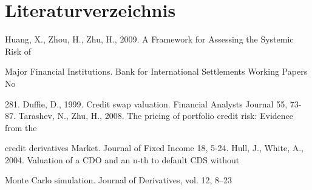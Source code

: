 \documentclass[a4paper,12pt]{scrartcl}
\begin{document}
\section{Literaturverzeichnis}

Huang, X., Zhou, H., Zhu, H., 2009. A Framework for Assessing the Systemic Risk of

Major Financial Institutions. Bank for International Settlements Working Papers  No

281.
\newline
\newline
Duffie, D., 1999. Credit swap valuation. Financial Analysts Journal 55, 73-87.
\newline
\newline
Tarashev, N., Zhu, H., 2008. The pricing of portfolio credit risk: Evidence from the

credit derivatives Market. Journal of Fixed Income 18, 5-24.
\newline
\newline
Hull, J., White, A., 2004. Valuation of a CDO and an n-th to default CDS without

Monte Carlo simulation. Journal of Derivatives, vol. 12, 8–23
\end{document}
